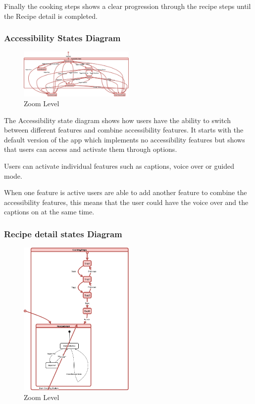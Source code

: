 \documentclass[]{project_final}
\begin{document}
Finally the cooking steps shows a clear progression through the recipe steps until the Recipe detail is completed.


\newpage

\subsubsection{Accessibility States Diagram}
\begin{figure}[ht!]
  \centering
  \includegraphics[width=0.5\textwidth]{accessibilityStatesMRA.png}
  \vspace*{0.0cm}
  \caption{Zoom Level}
  \label{fig:1}
\end{figure}

The Accessibility state diagram shows how users have the ability to switch between different features and combine accessibility features. It starts with the default version of the app which implements no accessibility features but shows that users can access and activate them through options.

Users can activate individual features such as captions, voice over or guided mode.

When one feature is active users are able to add another feature to combine the accessibility features, this means that the user could have the voice over and the captions on at the same time.


\newpage

\subsubsection{Recipe detail states Diagram}
\begin{figure}[ht!]
  \centering
  \includegraphics[width=0.5\textwidth]{RecipeDetailStateMRA.png}
  \vspace*{0.0cm}
  \caption{Zoom Level}
  \label{fig:1}
\end{figure}
\end{document}
